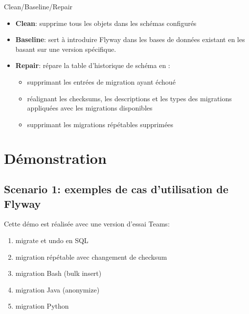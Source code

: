 \documentclass[slidestop,compress,11pt,xcolor=dvipsnames,french]{beamer}
\begin{document}
\begin{frame}{Clean/Baseline/Repair}
\vspace{1cm}
\begin{itemize}
 \item \textbf{Clean}: supprime tous les objets dans les schémas configurés
 \item \textbf{Baseline}: sert à introduire Flyway dans les bases de données existant en les basant sur une version spécifique.
 \item \textbf{Repair}: répare la table d'historique de schéma en :
    \begin{itemize}
        \item supprimant les entrées de migration ayant échoué
        \item réalignant les checksums, les descriptions et les types des migrations appliquées avec les migrations disponibles
        \item supprimant les migrations répétables supprimées
    \end{itemize}
\end{itemize}
\end{frame}

\section[Démo]{Démonstration}
\subsection*{Scenario 1: exemples de cas d'utilisation de Flyway }
\begin{frame}
Cette démo est réalisée avec une version d'essai Teams:
\begin{enumerate}
 \item migrate et undo en SQL 
 \item migration répétable avec changement de checksum
 \item migration Bash (bulk insert)
 \item migration Java (anonymize)
 \item migration Python 
\end{enumerate}
\end{frame}
\end{document}
